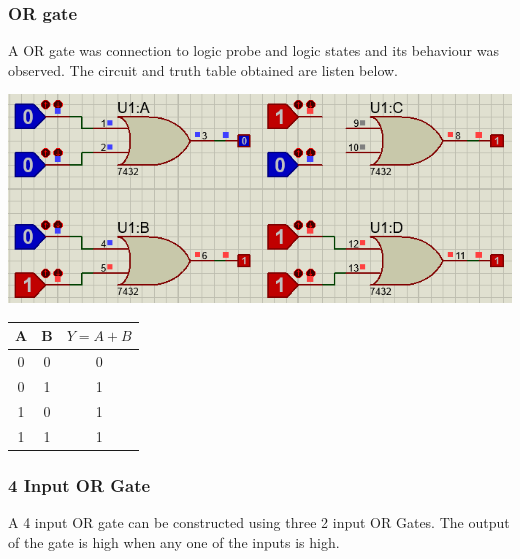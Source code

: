 \documentclass[a4paper, 12pt]{article}
\begin{document}
\subsubsection{OR gate}
A OR gate was connection to logic probe and logic states and its behaviour was observed.
The circuit and truth table obtained are listen below. \\

\begin{minipage}[c]{.7\textwidth}
  \centering
  \includegraphics[scale=0.5]{or}
\end{minipage}
\begin{minipage}{.3\textwidth}
  \begin{center}
    \begin{tabular}{ |c|c|c| }
      \hline
      A & B & $Y=A+B$ \\
      \hline
      0 & 0 & 0 \\
      \hline
      0 & 1 & 1 \\
      \hline
      1 & 0 & 1 \\
      \hline
      1 & 1 & 1 \\
      \hline
    \end{tabular}
  \end{center}
\end{minipage}

\subsubsection{4 Input OR Gate}
A 4 input OR gate can be constructed using three 2 input OR Gates. The output of the gate is high when any one of the inputs is high.
\end{document}
